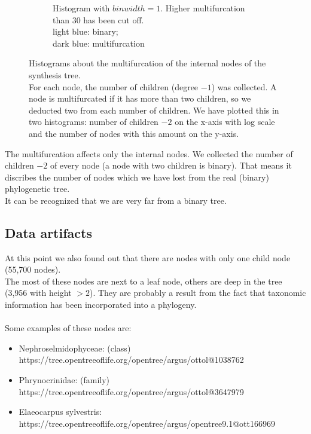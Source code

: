 \begin{figure}
\begin{subfigure}[b]{0.4\textwidth}
        \caption{Histogram with $binwidth = 1$. Higher multifurcation than 30 has been cut off. \\ light blue: binary; \\ dark blue: multifurcation}
      \end{subfigure}
      \caption{Histograms about the multifurcation of the internal nodes of the synthesis tree. \\
        For each node, the number of children (degree $-1$) was collected. A node is multifurcated 
        if it has more than two children, so we deducted two from each number of children. We have 
        plotted this in two histograms: number of children $-2$ on the x-axis with log scale and the 
        number of nodes with this amount on the y-axis.}
      \label{fig:childrenOfNodes}
    \end{figure}
    The multifurcation affects only the internal nodes. We collected the number of children $-2$ of 
      every node (a node with two children is binary). That means it discribes the number of nodes 
      which we have lost from the real (binary) phylogenetic tree. \\
    It can be recognized that we are very far from a binary tree. \\

    \subsection{Data artifacts}
      At this point we also found out that there are nodes with only one child node (55,700 nodes). \\
      The most of these nodes are next to a leaf node, others are deep in the tree (3,956 with height 
        $>2$). They are probably a result from the fact that taxonomic information has been incorporated 
        into a phylogeny. \\
       \\
      Some examples of these nodes are:
      \begin{itemize}
        \item Nephroselmidophyceae: (class) \\
          https://tree.opentreeoflife.org/opentree/argus/ottol@1038762
        \item Phrynocrinidae: (family) \\
          https://tree.opentreeoflife.org/opentree/argus/ottol@3647979
        \item Elaeocarpus sylvestris: \\
          https://tree.opentreeoflife.org/opentree/argus/opentree9.1@ott166969
      \end{itemize}


